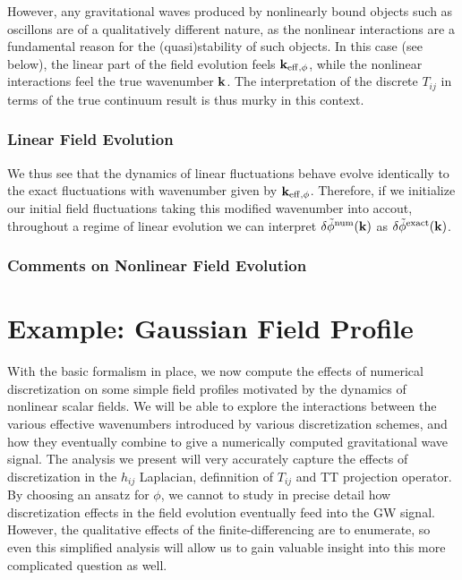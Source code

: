 \documentclass{revtex4}
\begin{document}
However, any gravitational waves produced by nonlinearly bound objects such as oscillons are of a qualitatively different nature, as the nonlinear interactions are a fundamental reason for the (quasi)stability of such objects.
In this case (see below), the linear part of the field evolution feels ${\bf k}_{{\rm eff},\phi}$, while the nonlinear interactions feel the true wavenumber ${\bf k}$.
The interpretation of the discrete $T_{ij}$ in terms of the true continuum result is thus murky in this context.

\subsubsection{Linear Field Evolution}
We thus see that the dynamics of linear fluctuations behave evolve identically to the exact fluctuations with wavenumber given by ${\bf k}_{{\rm eff},\phi}$.
Therefore, if we initialize our initial field fluctuations taking this modified wavenumber into accout, throughout a regime of linear evolution we can interpret $\delta\tilde{\phi}^{\rm num}({{\bf k}})$ as $\delta\tilde{\phi}^{\rm exact}({{\bf k}})$.

\subsubsection{Comments on Nonlinear Field Evolution}


\section{Example: Gaussian Field Profile}
With the basic formalism in place, we now compute the effects of numerical discretization on some simple field profiles motivated by the dynamics of nonlinear scalar fields.
We will be able to explore the interactions between the various effective wavenumbers introduced by various discretization schemes, and how they eventually combine to give a numerically computed gravitational wave signal.
The analysis we present will very accurately capture the effects of discretization in the $h_{ij}$ Laplacian, definnition of $T_{ij}$ and TT projection operator.
By choosing an ansatz for $\phi$, we cannot to study in precise detail how discretization effects in the field evolution eventually feed into the GW signal.
However, the qualitative effects of the finite-differencing are to enumerate, so even this simplified analysis will allow us to gain valuable insight into this more complicated question as well.
\end{document}
